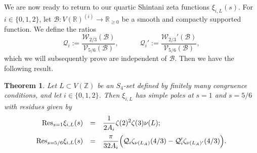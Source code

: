 \documentclass{article}
\def\Z{{\mathbb Z}}
\def\Res{{\rm Res}}
\def\R{{\mathbb R}}
\def\cB{{\mathcal B}}
\def\V{{\mathcal V}}
\def\Z{{\mathbb Z}}
\newtheorem{theorem}{Theorem}[section]
\begin{document}
We are now ready to return to our quartic Shintani zeta functions $\xi_{i,L}(s)$. For $i\in\{0,1,2\}$, let $\cB:V(\R)^{(i)}\to\R_{\geq 0}$ be a smooth and compactly supported function. We define the ratios
\begin{equation*}
\mathcal Q_i:=\frac{\mathcal W_{2/3}(\cB)}{\V_{5/6}(\cB)},
\quad\quad\quad
\mathcal Q_i':=\frac{\mathcal W_{2/3}'(\cB)}{\V_{5/6}(\cB)},
\end{equation*}
which we will subsequently prove are independent of $\cB$. Then we have the following result.
\begin{theorem}\label{th:quartic_szf_residues}
Let $L\subset V(\Z)$ be an $S_4$-set defined by finitely many congruence conditions, and let $i\in\{0,1,2\}$. Then $\xi_{i,L}$ has simple poles at $s=1$ and $s=5/6$ with residues given by
\begin{equation*}
\begin{array}{rcl}
\Res_{s=1}\xi_{i,L}(s)&=&
\displaystyle\frac{1}{2A_i}\zeta(2)^2\zeta(3)\nu(L);
\\[.15in]
\Res_{s=5/6}\xi_{i,L}(s)
&=&\displaystyle
\frac{\pi}{32A_i}
\Bigl(
\mathcal Q_i \zeta_{\nu(L_A)}(4/3)
-
\mathcal Q_i' \zeta_{\nu(L_A)'}(4/3)
\Bigr).
\end{array}
\end{equation*}
\end{theorem}
\end{document}
